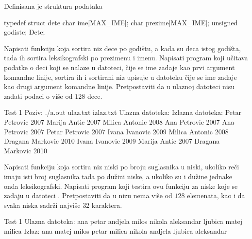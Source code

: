 \begin{Exercise}[label=510]
  Definisana je struktura podataka
\begin{ckod}
typedef struct dete
{
      char ime[MAX_IME];
      char prezime[MAX_IME];
      unsigned godiste;
} Dete;
\end{ckod}
Napisati funkciju koja sortira niz dece po godištu, a kada su deca
istog godišta, tada ih sortira leksikografski po prezimenu i
imenu. Napisati program koji učitava podatke o deci koji se nalaze u
datoteci, čije se ime zadaje kao prvi argument komandne linije,
sortira ih i sortirani niz upisuje u datoteku čije se ime zadaje kao
drugi argument komandne linije. Pretpostaviti da u ulaznoj datoteci
nisu zadati podaci o više od $128$ dece.
  
\begin{maxitest}
\begin{test}{Test 1}
Poziv: ./a.out ulaz.txt izlaz.txt
Ulazna datoteka:                 Izlazna datoteka:
Petar Petrovic 2007              Marija Antic 2007
Milica Antonic 2008              Ana Petrovic 2007
Ana Petrovic 2007                Petar Petrovic 2007
Ivana Ivanovic 2009              Milica Antonic 2008
Dragana Markovic 2010            Ivana Ivanovic 2009
Marija Antic 2007                Dragana Markovic 2010
\end{test}
\end{maxitest}
  
\end{Exercise}

\begin{Exercise}[label=511]
  Napisati funkciju koja sortira niz niski po broju suglasnika u
  niski, ukoliko reči imaju isti broj suglasnika tada po dužini niske,
  a ukoliko su i dužine jednake onda leksikografski.  Napisati program
  koji testira ovu funkciju za niske koje se zadaju u datoteci
  .  Pretpostaviti da u nizu nema više od $128$
  elemenata, kao i da svaka niska sadrži najviše $32$ karaktera.
  
\begin{maxitest}
\begin{test}{Test 1}
Ulazna datoteka:
ana petar andjela milos nikola aleksandar ljubica matej milica
Izlaz:
ana matej milos petar milica nikola andjela ljubica aleksandar
\end{test}
\end{maxitest}
  
\end{Exercise}

